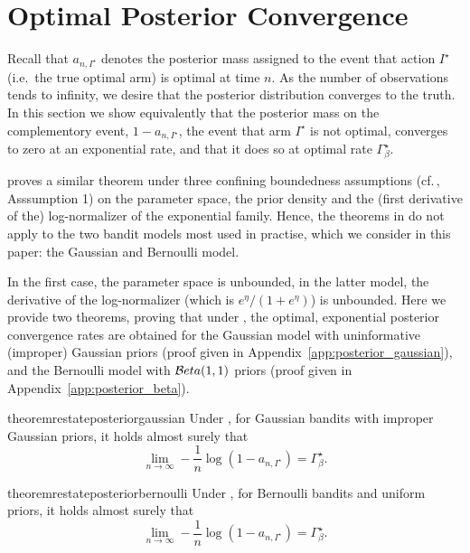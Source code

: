 

\section{Optimal Posterior Convergence
}\label{sec:bayesian}

Recall that $a_{n, I^\star}$ denotes the posterior mass assigned to the event that action $I^\star$ (i.e.\ the true optimal arm) is optimal at time $n$. As the number of observations tends to infinity, we desire that the posterior distribution converges to the truth. In this section we show equivalently that the posterior mass on the complementory event, $1 - a_{n, I^\star}$, the event that arm $I^\star$ is not optimal, converges to zero at an exponential rate, and that it does so at optimal rate $\Gamma_{\beta}^\star$. 

\citet{russo2016ttts} proves a similar theorem under three confining boundedness assumptions (cf.\,\citealt{russo2016ttts}, Asssumption 1) on the parameter space, the prior density and the (first derivative of the) log-normalizer of the exponential family. Hence, the theorems in \cite{russo2016ttts} do not apply to the two bandit models most used in practise, which we consider in this paper: the Gaussian and Bernoulli model. 

In the first case, the parameter space is unbounded, in the latter model, the derivative of the log-normalizer (which is $e^{\eta} / (1 + e^\eta)$) is unbounded. Here we provide two theorems, proving that under \TTTS, the optimal, exponential posterior convergence rates are obtained for the Gaussian model with uninformative (improper) Gaussian priors (proof given in Appendix~\ref{app:posterior_gaussian}), and the Bernoulli model with $\mathcal{B} eta(1,1)$ priors (proof given in Appendix~\ref{app:posterior_beta}).

\begin{restatable}{theorem}{restateposteriorgaussian}\label{thm:posterior_gaussian}
    Under \TTTS, for Gaussian bandits with improper Gaussian priors, it holds almost surely that 
    \[
        \lim_{n\rightarrow{\infty}} -\frac{1}{n}\log(1-a_{n,I^\star}) = \Gamma_{\beta}^\star.
    \]
\end{restatable}

\begin{restatable}{theorem}{restateposteriorbernoulli}\label{thm:posterior_bernoulli}
	Under \TTTS, for Bernoulli bandits and uniform priors, it holds almost surely that
	\[
	\lim_{n\rightarrow{\infty}} -\frac{1}{n}\log(1-a_{n,I^\star}) = \Gamma_{\beta}^\star.
	\]
\end{restatable}
